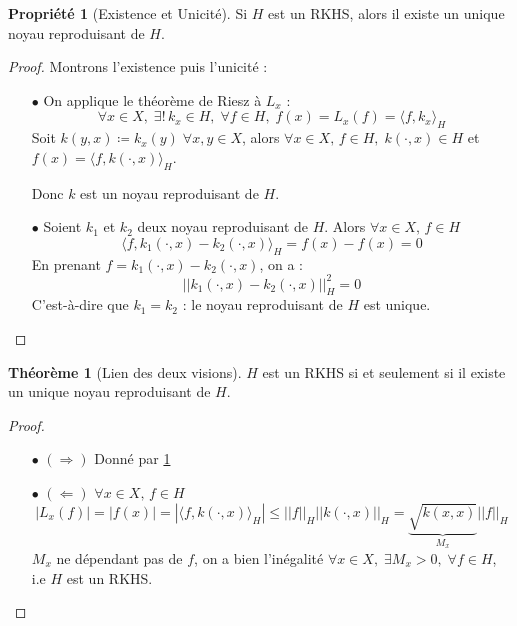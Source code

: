 \documentclass[a4paper, 11pt, french]{article}
\theoremstyle{definition}
\newtheorem{theorem}{Théorème}
\newtheorem{property}{Propriété}
\begin{document}
	\begin{property}[Existence et Unicité]
	\label{th:existunicity}
		Si $H$ est un RKHS, alors il existe un unique noyau reproduisant de $H$.
	\end{property}
	\begin{proof}
		Montrons l'existence puis l'unicité : \\
		\begin{itemize}
			\item[$\bullet$]
			On applique le théorème de Riesz à $L_x$ :
			\[\forall x \in X, \; \exists ! \, k_x \in H, \; \forall f \in H, \; f(x) = L_x (f) = \langle f, k_x \rangle_H\]
			Soit $k(y, x) \coloneqq k_x(y) \; \forall x,y \in X$, alors $\forall x \in X, \, f \in H, \; k(\cdot, x) \in H$ et  $f(x) = \langle f, k(\cdot, x) \rangle_H$.
			
			Donc $k$ est un noyau reproduisant de $H$.
			
			\item[$\bullet$]
			Soient $k_1$ et $k_2$ deux noyau reproduisant de $H$. Alors $\forall x \in X, \, f \in H$
			\[\langle f, k_1(\cdot, x) - k_2(\cdot, x) \rangle_H = f(x) - f(x) = 0\]
			En prenant $f = k_1(\cdot, x) - k_2(\cdot, x)$, on a :
			\[\left|\left| k_1(\cdot, x) - k_2(\cdot, x) \right|\right|_H^2 = 0\]
			C'est-à-dire que $k_1 = k_2$ : le noyau reproduisant de $H$ est unique.
		\end{itemize}
	\end{proof}

	\begin{theorem}[Lien des deux visions]
		\label{th:link2visions}
		$H$ est un RKHS si et seulement si il existe un unique noyau reproduisant de $H$.
	\end{theorem}
	\begin{proof}
		\begin{itemize}
			\item[$\bullet$] $(\Rightarrow)$
				Donné par \ref{th:existunicity} 
			\item[$\bullet$] $(\Leftarrow)$ $\forall x \in X, \, f \in H$
				\[|L_x(f)| = |f(x)| = |\langle f, k(\cdot, x) \rangle_H| \leq ||f||_H ||k(\cdot,x)||_H = \underbrace{\sqrt{k(x,x)}}_{\text{$M_x$}} ||f||_H\]
				$M_x$ ne dépendant pas de $f$, on a bien l'inégalité $\forall x \in X, \;  \exists M_x > 0, \; \forall f \in H$, i.e $H$ est un RKHS.
		\end{itemize}
	\end{proof}
	
\end{document}
